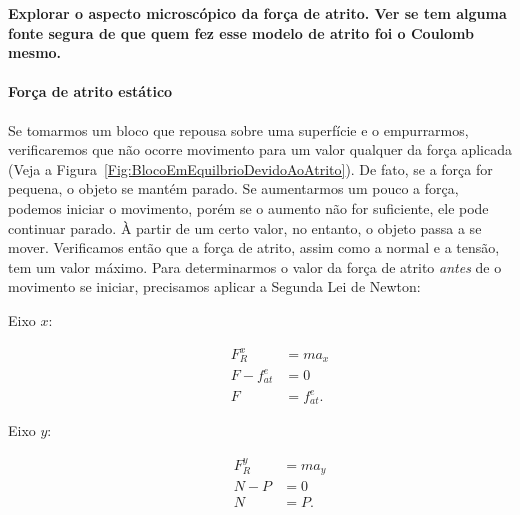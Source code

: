 \textbf{Explorar o aspecto microscópico da força de atrito. Ver se tem alguma fonte segura de que quem fez esse modelo de atrito foi o Coulomb mesmo.}


\paragraph{Força de atrito estático} 

Se tomarmos um bloco que repousa sobre uma superfície e o empurrarmos, verificaremos que não ocorre movimento para um valor qualquer da força aplicada (Veja a Figura~\ref{Fig:BlocoEmEquilbrioDevidoAoAtrito}). De fato, se a força for pequena, o objeto se mantém parado. Se aumentarmos um pouco a força, podemos iniciar o movimento, porém se o aumento não for suficiente, ele pode continuar parado. À partir de um certo valor, no entanto, o objeto passa a se mover. Verificamos então que a força de atrito, assim como a normal e a tensão, tem um valor máximo. Para determinarmos o valor da força de atrito \emph{antes} de o movimento se iniciar, precisamos aplicar a Segunda Lei de Newton:
\begin{description}
    \item[Eixo $x$:]
        \begin{align}
            F_R^x &= m a_x \\
            F - f_{at}^e &= 0 \\
            F &= f_{at}^e.
        \end{align}
    \item[Eixo $y$:]
        \begin{align}
            F_R^y &= m a_y \\
            N - P &= 0 \\
            N &= P.
        \end{align}
\end{description}

